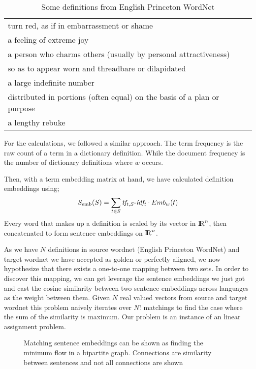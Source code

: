 \begin{table}
    \centering
    \caption{Some definitions from English Princeton WordNet}%
    \label{tab:en_it_examples}
    \begin{tabular}{l}
        \toprule
        turn red, as if in embarrassment or shame \\
        a feeling of extreme joy \\
        a person who charms others (usually by personal attractiveness) \\
        so as to appear worn and threadbare or dilapidated \\
        a large indefinite number \\
        distributed in portions (often equal) on the basis of a plan or purpose \\
        a lengthy rebuke \\
        \bottomrule
    \end{tabular}
\end{table}

For the \tfidf{} calculations, we followed a similar approach.
The term frequency is the raw count of a term in a dictionary definition.
While the document frequency is the number of dictionary definitions where $w$ occurs.

Then, with a term embedding matrix at hand, we have calculated definition embeddings using;
\begin{equation}
    S_{\text{emb}}(S) = \sum_{t \in S} {\operatorname{\mathit{tf_{t,S}-idf_{t}}}} \cdot Emb_{w}(t)
\end{equation}
Every word that makes up a definition is scaled by its vector in ${\rm I\!R}^n$, then concatenated to form sentence embeddings on ${\rm I\!R}^n$.

As we have $N$ definitions in source wordnet (English Princeton WordNet) and target wordnet we have accepted as golden or perfectly aligned, we now hypothesize that there exists a one-to-one mapping between two sets.
In order to discover this mapping, we can get leverage the sentence embeddings we just got and cast the cosine similarity between two sentence embeddings across languages as the weight between them.
Given $N$ real valued vectors from source and target wordnet this problem naively iterates over $N!$ matchings to find the case where the sum of the similarity is maximum.
Our problem is an instance of an linear assignment problem.

\begin{figure}[htbp]
    \centering
    \caption{Matching sentence embeddings can be shown as finding the minimum flow in a bipartite graph. Connections are similarity between sentences and not all connections are shown}%
    \label{fig:bipartite_graph}
\end{figure}

